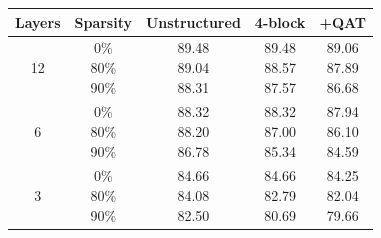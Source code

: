 \documentclass[11pt]{article}
\begin{document}
\begin{table}
    \centering
    {\small
    \begin{tabular}{c|c|c|cc}
        \toprule
        Layers & Sparsity & Unstructured & 4-block & +QAT \\
        \midrule
        12 &  \makecell{0\% \\ 80\% \\90\%} & \makecell{89.48 \\ 89.04 \\ 88.31} & \makecell{89.48 \\ 88.57 \\ 87.57} & \makecell{89.06 \\ 87.89 \\ 86.68}\\
        \midrule
        6 & \makecell{0\% \\ 80\% \\90\%} & \makecell{88.32 \\ 88.20 \\ 86.78} & \makecell{88.32 \\ 87.00 \\ 85.34}  & \makecell{87.94 \\ 86.10 \\ 84.59}\\
        \midrule
        3 & \makecell{0\% \\ 80\% \\90\%}  & \makecell{84.66 \\ 84.08 \\ 82.50} & \makecell{84.66 \\ 82.79 \\ 80.69} & \makecell{84.25 \\ 82.04 \\ 79.66} \\
        \bottomrule
    \end{tabular}
    \label{tab:downstream-block}}
    \vspace{-1.2em}
\end{table}
\end{document}
